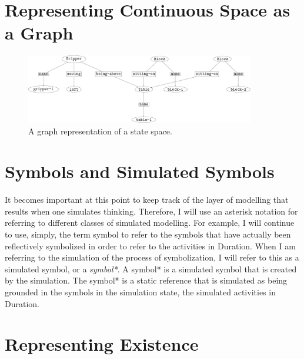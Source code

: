\section{Representing Continuous Space as a Graph}

\begin{figure}
\includegraphics[width=10cm]{gfx/simulation_example_state}
\caption{A graph representation of a state space.}
\label{figure:simulation_example_state}
\end{figure}







\section{Symbols and Simulated Symbols}

It becomes important at this point to keep track of the layer of
modelling that results when one simulates thinking.  Therefore, I will
use an asterisk notation for referring to different classes of
simulated modelling.  For example, I will continue to use, simply, the
term symbol to refer to the symbols that have actually been
reflectively symbolized in order to refer to the activities in
Duration.  When I am referring to the simulation of the process of
symbolization, I will refer to this as a simulated symbol, or a
\emph{symbol*}.  A symbol* is a simulated symbol that is created by
the simulation.  The symbol* is a static reference that is simulated
as being grounded in the symbols in the simulation state, the
simulated activities in Duration.

\section{Representing Existence}

